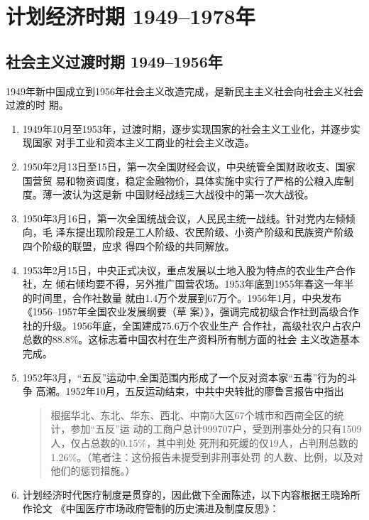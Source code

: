 \chapter{计划经济时期 1949--1978年}

\section{社会主义过渡时期 1949--1956年}
\label{sec:hongguodu}

1949年新中国成立到1956年社会主义改造完成，是新民主主义社会向社会主义社会过渡的时
期。

\begin{enumerate}
\item 1949年10月至1953年，过渡时期，逐步实现国家的社会主义工业化，并逐步实现国家
  对手工业和资本主义工商业的社会主义改造。

\item 1950年2月13日至15日，第一次全国财经会议，中央统管全国财政收支、国家国营贸
  易和物资调度，稳定金融物价，具体实施中实行了严格的公粮入库制度。薄一波认为这是新
  中国财经战线三大战役中的第一次大战役。

\item 1950年3月16日，第一次全国统战会议，人民民主统一战线。针对党内左倾倾向，毛
  泽东提出现阶段是工人阶级、农民阶级、小资产阶级和民族资产阶级四个阶级的联盟，应求
  得四个阶级的共同解放。

\item 1953年2月15日，中央正式决议，重点发展以土地入股为特点的农业生产合作社，左
  倾右倾均要不得，另外推广国营农场。1953年底到1955年春这一年半的时间里，合作社数量
  就由1.4万个发展到67万个。1956年1月，中央发布《1956--1957年全国农业发展纲要（草
  案）》，强调完成初级合作社到高级合作社的升级。1956年底，全国建成75.6万个农业生产
  合作社，高级社农户占农户总数的88.8\%。这标志着中国农村在生产资料所有制方面的社会
  主义改造基本完成。

\item 1952年3月，“五反”运动中,全国范围内形成了一个反对资本家“五毒”行为的斗争
  高潮。1952年10月，五反运动结束，中共中央转批的廖鲁言报告中指出
  \begin{quotation}
    根据华北、东北、华东、西北、中南5大区67个城市和西南全区的统计，参加“五反”运
    动的工商户总计999707户，受到刑事处分的只有1509人，仅占总数的0.15\%，其中判处
    死刑和死缓的仅19人，占判刑总数的1.26\%。（笔者注：这份报告未提受到非刑事处罚
    的人数、比例，以及对他们的惩罚措施。）
  \end{quotation}

\item 计划经济时代医疗制度是贯穿的，因此做下全面陈述，以下内容根据王晓玲所作论文
  《中国医疗市场政府管制的历史演进及制度反思》\cite{yiliaoshi}：


\end{enumerate}
